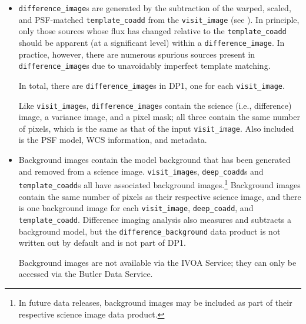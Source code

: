 \begin{itemize}

\item \texttt{difference\_image}s are generated by the subtraction of the warped, scaled, and PSF-matched \texttt{template\_coadd} from the \texttt{visit\_image} (see ). In principle, only those sources whose flux has changed relative to the \texttt{template\_coadd} should be apparent (at a significant level) within a \texttt{difference\_image}. In practice, however, there are numerous spurious sources present in \texttt{difference\_image}s due to unavoidably imperfect template matching.

In total, there are \ndifferenceimages \texttt{difference\_image}s in DP1, one for each \texttt{visit\_image}.

Like \texttt{visit\_image}s, \texttt{difference\_image}s contain the science (i.e., difference) image, a variance image, and a pixel mask; all three contain the same number of pixels, which is the same as that of the input \texttt{visit\_image}. Also included is the PSF model, WCS information, and metadata.


\item Background images contain the model background that has been generated and removed from a science image. 
\texttt{visit\_image}s, \texttt{deep\_coadd}s and \texttt{template\_coadd}s all have associated background images.\footnote{In future data releases, background images may be included as part of their respective science image data product.} Background images contain the same number of pixels as their respective science image, and there is one background image for each \texttt{visit\_image}, \texttt{deep\_coadd}, and \texttt{template\_coadd}.
Difference imaging analysis also measures and subtracts a background model, but the \texttt{difference\_background} data product is not written out by default and is not part of DP1.

Background images are not available via the IVOA Service; they can only be accessed via the Butler Data Service.




\end{itemize}

